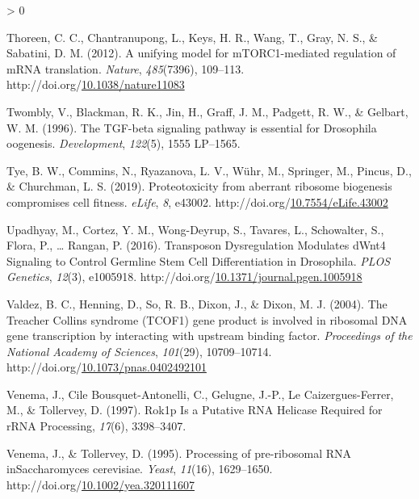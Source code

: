 \documentclass[12pt,oneside]{reedthesis}
\newlength{\cslhangindent}
\newenvironment{CSLReferences}[2] %
 {%
  \setlength{\parindent}{0pt}
  \ifodd #1 \everypar{\setlength{\hangindent}{\cslhangindent}}\ignorespaces\fi
  \ifnum #2 > 0
  \setlength{\parskip}{#2\baselineskip}
  \fi
 }%
 {}
\begin{document}
\begin{CSLReferences}{1}{0}
\leavevmode\hypertarget{ref-thoreenUnifyingModelMTORC1mediated2012}{}%
Thoreen, C. C., Chantranupong, L., Keys, H. R., Wang, T., Gray, N. S., \& Sabatini, D. M. (2012). A unifying model for {mTORC1-mediated} regulation of {mRNA} translation. \emph{Nature}, \emph{485}(7396), 109--113. http://doi.org/\href{https://doi.org/10.1038/nature11083}{10.1038/nature11083}

\leavevmode\hypertarget{ref-Twombly1996d}{}%
Twombly, V., Blackman, R. K., Jin, H., Graff, J. M., Padgett, R. W., \& Gelbart, W. M. (1996). The {TGF-beta} signaling pathway is essential for {Drosophila} oogenesis. \emph{Development}, \emph{122}(5), 1555 LP--1565.

\leavevmode\hypertarget{ref-tyeProteotoxicityAberrantRibosome2019}{}%
Tye, B. W., Commins, N., Ryazanova, L. V., Wühr, M., Springer, M., Pincus, D., \& Churchman, L. S. (2019). Proteotoxicity from aberrant ribosome biogenesis compromises cell fitness. \emph{eLife}, \emph{8}, e43002. http://doi.org/\href{https://doi.org/10.7554/eLife.43002}{10.7554/eLife.43002}

\leavevmode\hypertarget{ref-upadhyayTransposonDysregulationModulates2016}{}%
Upadhyay, M., Cortez, Y. M., Wong-Deyrup, S., Tavares, L., Schowalter, S., Flora, P., \ldots{} Rangan, P. (2016). Transposon {Dysregulation Modulates dWnt4 Signaling} to {Control Germline Stem Cell Differentiation} in {Drosophila}. \emph{PLOS Genetics}, \emph{12}(3), e1005918. http://doi.org/\href{https://doi.org/10.1371/journal.pgen.1005918}{10.1371/journal.pgen.1005918}

\leavevmode\hypertarget{ref-valdezTreacherCollinsSyndrome2004}{}%
Valdez, B. C., Henning, D., So, R. B., Dixon, J., \& Dixon, M. J. (2004). The {Treacher Collins} syndrome ({TCOF1}) gene product is involved in ribosomal {DNA} gene transcription by interacting with upstream binding factor. \emph{Proceedings of the National Academy of Sciences}, \emph{101}(29), 10709--10714. http://doi.org/\href{https://doi.org/10.1073/pnas.0402492101}{10.1073/pnas.0402492101}

\leavevmode\hypertarget{ref-Venema1997}{}%
Venema, J., Cile Bousquet-Antonelli, C., Gelugne, J.-P., Le Caizergues-Ferrer, M., \& Tollervey, D. (1997). Rok1p {Is} a {Putative RNA Helicase Required} for {rRNA Processing}, \emph{17}(6), 3398--3407.

\leavevmode\hypertarget{ref-venemaProcessingPreribosomalRNA1995}{}%
Venema, J., \& Tollervey, D. (1995). Processing of pre-ribosomal {RNA inSaccharomyces} cerevisiae. \emph{Yeast}, \emph{11}(16), 1629--1650. http://doi.org/\href{https://doi.org/10.1002/yea.320111607}{10.1002/yea.320111607}


\end{CSLReferences}
\end{document}
